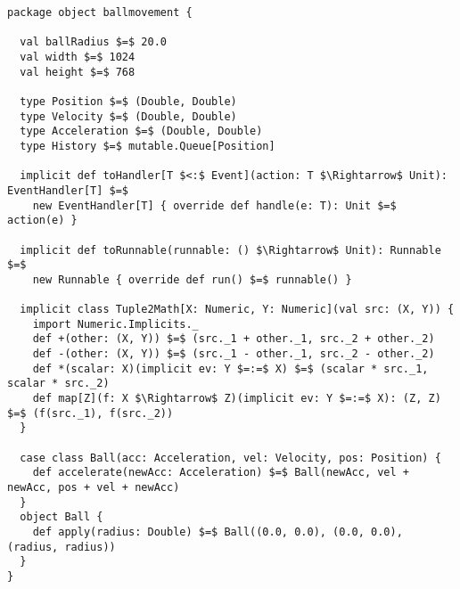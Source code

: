 \hspace*{-\parindent}
\begin{lstlisting}[style=ScalaStyle, caption={Ball movement control}, label={lst:ball-full-utils}]
package object ballmovement {

  val ballRadius $=$ 20.0
  val width $=$ 1024
  val height $=$ 768

  type Position $=$ (Double, Double)
  type Velocity $=$ (Double, Double)
  type Acceleration $=$ (Double, Double)
  type History $=$ mutable.Queue[Position]
  
  implicit def toHandler[T $<:$ Event](action: T $\Rightarrow$ Unit): EventHandler[T] $=$
    new EventHandler[T] { override def handle(e: T): Unit $=$ action(e) }

  implicit def toRunnable(runnable: () $\Rightarrow$ Unit): Runnable $=$
    new Runnable { override def run() $=$ runnable() }

  implicit class Tuple2Math[X: Numeric, Y: Numeric](val src: (X, Y)) {
    import Numeric.Implicits._
    def +(other: (X, Y)) $=$ (src._1 + other._1, src._2 + other._2)
    def -(other: (X, Y)) $=$ (src._1 - other._1, src._2 - other._2)
    def *(scalar: X)(implicit ev: Y $=:=$ X) $=$ (scalar * src._1, scalar * src._2)
    def map[Z](f: X $\Rightarrow$ Z)(implicit ev: Y $=:=$ X): (Z, Z) $=$ (f(src._1), f(src._2))
  }

  case class Ball(acc: Acceleration, vel: Velocity, pos: Position) {
    def accelerate(newAcc: Acceleration) $=$ Ball(newAcc, vel + newAcc, pos + vel + newAcc)
  }
  object Ball {
    def apply(radius: Double) $=$ Ball((0.0, 0.0), (0.0, 0.0), (radius, radius))
  }
}
\end{lstlisting}
